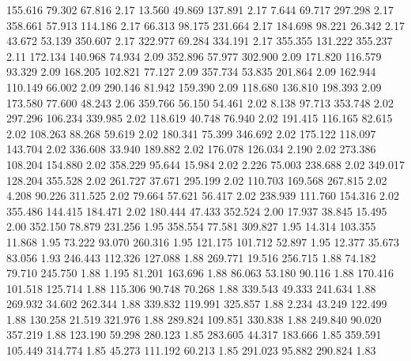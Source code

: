  155.616   79.302   67.816         2.17
  13.560   49.869  137.891         2.17
   7.644   69.717  297.298         2.17
 358.661   57.913  114.186         2.17
  66.313   98.175  231.664         2.17
 184.698   98.221   26.342         2.17
  43.672   53.139  350.607         2.17
 322.977   69.284  334.191         2.17
 355.355  131.222  355.237         2.11
 172.134  140.968   74.934         2.09
 352.896   57.977  302.900         2.09
 171.820  116.579   93.329         2.09
 168.205  102.821   77.127         2.09
 357.734   53.835  201.864         2.09
 162.944  110.149   66.002         2.09
 290.146   81.942  159.390         2.09
 118.680  136.810  198.393         2.09
 173.580   77.600   48.243         2.06
 359.766   56.150   54.461         2.02
   8.138   97.713  353.748         2.02
 297.296  106.234  339.985         2.02
 118.619   40.748   76.940         2.02
 191.415  116.165   82.615         2.02
 108.263   88.268   59.619         2.02
 180.341   75.399  346.692         2.02
 175.122  118.097  143.704         2.02
 336.608   33.940  189.882         2.02
 176.078  126.034    2.190         2.02
 273.386  108.204  154.880         2.02
 358.229   95.644   15.984         2.02
   2.226   75.003  238.688         2.02
 349.017  128.204  355.528         2.02
 261.727   37.671  295.199         2.02
 110.703  169.568  267.815         2.02
   4.208   90.226  311.525         2.02
  79.664   57.621   56.417         2.02
 238.939  111.760  154.316         2.02
 355.486  144.415  184.471         2.02
 180.444   47.433  352.524         2.00
  17.937   38.845   15.495         2.00
 352.150   78.879  231.256         1.95
 358.554   77.581  309.827         1.95
  14.314  103.355   11.868         1.95
  73.222   93.070  260.316         1.95
 121.175  101.712   52.897         1.95
  12.377   35.673   83.056         1.93
 246.443  112.326  127.088         1.88
 269.771   19.516  256.715         1.88
  74.182   79.710  245.750         1.88
   1.195   81.201  163.696         1.88
  86.063   53.180   90.116         1.88
 170.416  101.518  125.714         1.88
 115.306   90.748   70.268         1.88
 339.543   49.333  241.634         1.88
 269.932   34.602  262.344         1.88
 339.832  119.991  325.857         1.88
   2.234   43.249  122.499         1.88
 130.258   21.519  321.976         1.88
 289.824  109.851  330.838         1.88
 249.840   90.020  357.219         1.88
 123.190   59.298  280.123         1.85
 283.605   44.317  183.666         1.85
 359.591  105.449  314.774         1.85
  45.273  111.192   60.213         1.85
 291.023   95.882  290.824         1.83
